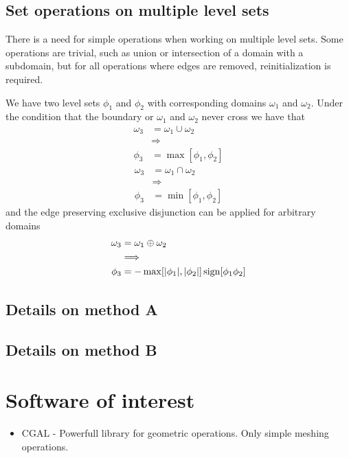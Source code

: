 \documentclass[a4paper,10pt]{article}
\DeclarePairedDelimiter\abs{\lvert}{\rvert}
\DeclareMathOperator*{\sign}{sign}
\begin{document}
\subsection{Set operations on multiple level sets}
There is a need for simple operations when working on multiple level sets.
Some operations are trivial, such as union or intersection of a domain with a subdomain, but for all operations where edges are removed, reinitialization is required.

We have two level sets $\phi_1$ and $\phi_2$ with corresponding domains $\omega_1$ and $\omega_2$.
Under the condition that the boundary or $\omega_1$ and $\omega_2$ never cross we have that
\begin{align}
	\omega_3 &= \omega_1 \cup \omega_2\\
	         &\Longrightarrow\\
	\phi_3   &= \max[\phi_1,\phi_2]
\end{align}
\begin{align}
	\omega_3 &= \omega_1 \cap \omega_2\\
	         &\Longrightarrow\\
	\phi_3   &= \min[\phi_1,\phi_2]
\end{align}
and the edge preserving exclusive disjunction can be applied for arbitrary domains
\begin{align}
	\omega_3 &= \omega_1 \oplus \omega_2\\
	         &\Longrightarrow\\
	\phi_3   &= -\max[\abs{\phi_1},\abs{\phi_2}]\sign[\phi_1 \phi_2]
\end{align}

\subsection{Details on method A}

\subsection{Details on method B}

\section{Software of interest}
\begin{itemize}
\item CGAL - Powerfull library for geometric operations. Only simple meshing operations.
\end{itemize}
\end{document}
